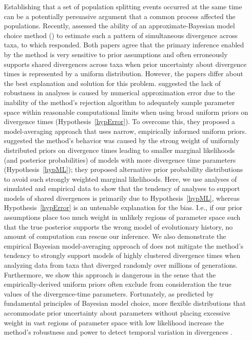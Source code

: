 Establishing that a set of population splitting events occurred at the same
time can be a potentially persuasive argument that a common process affected
the populations.
Recently, \citet{Oaks2012} assessed the ability of an approximate-Bayesian
model choice method (\msb) to estimate such a pattern of simultaneous
divergence across taxa, to which \citet{Hickerson2013} responded.
Both papers agree that the primary inference enabled by the method is very
sensitive to prior assumptions and often erroneously supports shared
divergences across taxa when prior uncertainty about divergence times
is represented by a uniform distribution.
However, the papers differ about the best explanation and solution for this
problem.
\citet{Hickerson2013} suggested the lack of robustness in \msb analyses is
caused by numerical approximation error due to the inability of the method's
rejection algorithm to adequately sample parameter space within reasonable
computational limits when using broad uniform priors on divergence times
(Hypothesis~\ref{hypError}).
To overcome this, they proposed a model-averaging approach that uses narrow,
empirically informed uniform priors.
\citet{Oaks2012} suggested the method's behavior was caused by the strong
weight of uniformly distributed priors on divergence times leading to smaller
marginal likelihoods (and posterior probabilities) of models with more
divergence time parameters
(Hypothesis~\ref{hypML}); they proposed alternative prior probability
distributions to avoid such strongly weighted marginal likelihoods.
Here, we use analyses of simulated and empirical data to show that the tendency
of \msb analyses to support models of shared divergences is primarily due to
Hypothesis~\ref{hypML}, whereas Hypothesis~\ref{hypError} is an untenable
explanation for the bias.
I.e., if our prior assumptions place too much weight in unlikely regions of
parameter space such that the true posterior supports the wrong model of
evolutionary history, no amount of computation can rescue our inference. 
We also demonstrate the empirical Bayesian model-averaging approach of
\citet{Hickerson2013} does not mitigate the method's tendency to strongly
support models of highly clustered divergence times when analyzing data from
taxa that diverged randomly over millions of generations.
Furthermore, we show this approach is dangerous in the sense that the
empirically-derived uniform priors often exclude from consideration the true
values of the divergence-time parameters.
Fortunately, as predicted by fundamental principles of Bayesian model choice,
more flexible distributions that accommodate prior uncertainty about parameters
without placing excessive weight in vast regions of parameter space with low
likelihood increase the method's robustness and power to detect temporal
variation in divergences \citep{Oaks2014dpp}.
